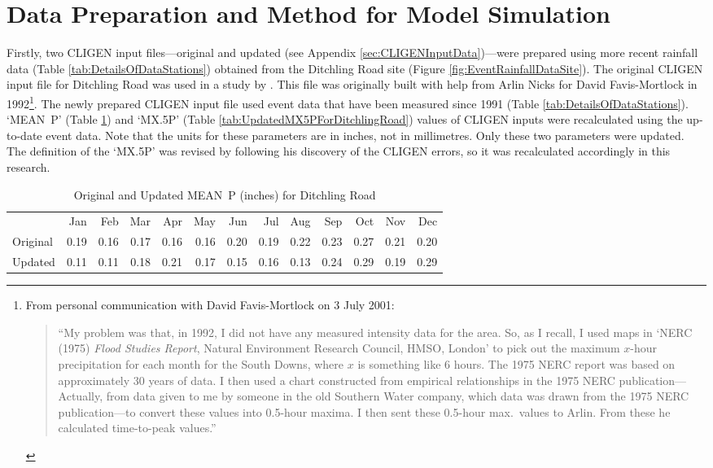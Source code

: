 \section{Data Preparation and Method for Model Simulation}
\label{sec:ImprovedCligenMethods}
Firstly, two CLIGEN input files---original and updated (see Appendix
\ref{sec:CLIGENInputData})---were prepared using more recent rainfall data
(Table \ref{tab:DetailsOfDataStations}) obtained from the Ditchling Road site
(Figure \ref{fig:EventRainfallDataSite}). The original CLIGEN input file for
Ditchling Road was used in a study by \citet{favis-mortlock1998-141}. This file
was originally built with help from Arlin Nicks for David Favis-Mortlock in
1992\footnote{From personal communication with David Favis-Mortlock on 3 July
2001: \begin{quotation} ``My problem was that, in 1992, I did not have any
measured intensity data for the area. So, as I recall, I used maps in `NERC
(1975) \textit{Flood Studies Report}, Natural Environment Research Council,
HMSO, London' to pick out the maximum $x$-hour precipitation for each month for
the South Downs, where $x$ is something like 6 hours. The 1975 NERC report was
based on approximately 30 years of data. I then used a chart constructed from
empirical relationships in the 1975 NERC publication---Actually, from data given
to me by someone in the old Southern Water company, which data was drawn from
the 1975 NERC publication---to convert these values into 0.5-hour maxima. I then
sent these 0.5-hour max.\ values to Arlin. From these he calculated time-to-peak
values.'' \end{quotation}}. The newly prepared CLIGEN input file used event data
that have been measured since 1991 (Table \ref{tab:DetailsOfDataStations}).
`MEAN~P' (Table \ref{tab:UpdatedMEANPForDitchlingRoad}) and `{MX.5P}' (Table
\ref{tab:UpdatedMX5PForDitchlingRoad}) values of CLIGEN inputs were recalculated
using the up-to-date event data. Note that the units for these parameters are in
inches, not in millimetres. Only these two parameters were updated. The
definition of the `{MX.5P}' was revised by \citet{yu2000-301} following his
discovery of the CLIGEN errors, so it was recalculated accordingly in this
research.

\begin{table}[htbp]
  \centering
  \caption[Original and Updated MEAN~P for Ditchling Road]{Original and
Updated MEAN~P (inches) for Ditchling Road}
  \label{tab:UpdatedMEANPForDitchlingRoad}
    \footnotesize
    \begin{tabular}{lrrrrrrrrrrrr}
    \toprule
     & Jan & Feb & Mar & Apr & May & Jun & Jul & Aug & Sep & Oct &
Nov & Dec\\
    \cmidrule{2-13}
    Original & 0.19 & 0.16 & 0.17 & 0.16 & 0.16 & 0.20 & 0.19 & 0.22
& 0.23 & 0.27 & 0.21 & 0.20\\
    Updated & 0.11 & 0.11 & 0.18 & 0.21 & 0.17 & 0.15 & 0.16 & 0.13
& 0.24 & 0.29 & 0.19 & 0.29\\
    \bottomrule
    \end{tabular}
\end{table}

